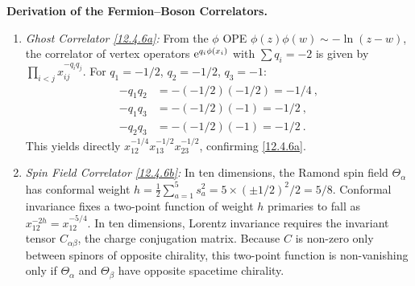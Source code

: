 \begin{tcolorbox}[breakable]
	\begin{remark}
		\textbf{Derivation of the Fermion--Boson Correlators.}
		\begin{enumerate}
			\item \emph{Ghost Correlator \eqref{12.4.6a}:} From the $\phi$ OPE $\phi(z)\phi(w) \sim -\ln(z-w)$, the correlator of vertex operators $\mathrm{e}^{q_{i}\phi(x_{i})}$ with $\sum q_{i} = -2$ is given by $\prod_{i<j}x_{ij}^{-q_{i}q_{j}}$. For $q_{1} = -1/2$, $q_{2} = -1/2$, $q_{3} = -1$:
			\begin{align*}
				-q_{1}q_{2} &= -(-1/2)(-1/2) = -1/4 \:, \\
				-q_{1}q_{3} &= -(-1/2)(-1) = -1/2 \:, \\
				-q_{2}q_{3} &= -(-1/2)(-1) = -1/2 \:.
			\end{align*}
			This yields directly $x_{12}^{-1/4}x_{13}^{-1/2}x_{23}^{-1/2}$, confirming \eqref{12.4.6a}.
			
			\item \emph{Spin Field Correlator \eqref{12.4.6b}:} In ten dimensions, the Ramond spin field $\Theta_{\alpha}$ has conformal weight $h = \frac{1}{2}\sum_{a=1}^{5}s_{a}^{2} = 5\times (\pm 1/2)^{2}/2 = 5/8$. Conformal invariance fixes a two-point function of weight $h$ primaries to fall as $x_{12}^{-2h} = x_{12}^{-5/4}$. In ten dimensions, Lorentz invariance requires the invariant tensor $C_{\alpha\beta}$, the charge conjugation matrix. Because $C$ is non-zero only between spinors of opposite chirality, this two-point function is non-vanishing only if $\Theta_{\alpha}$ and $\Theta_{\beta}$ have opposite spacetime chirality.
			

\end{enumerate}
\end{remark}
\end{tcolorbox}
